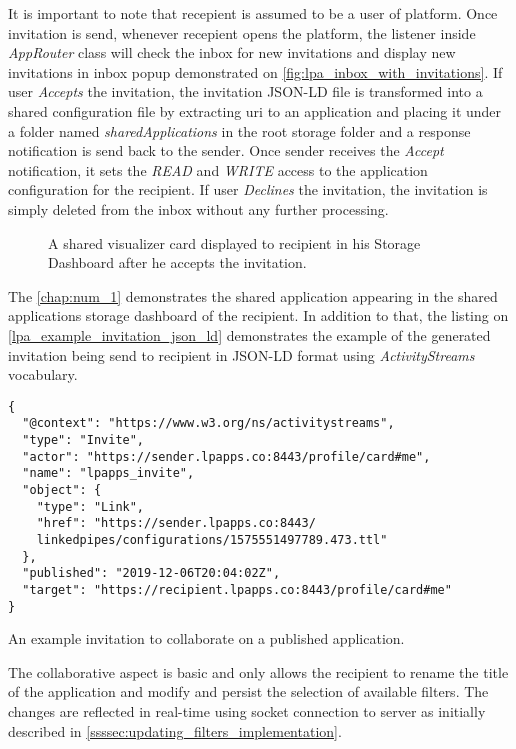  
It is important to note that recepient is assumed to be a user of \lpa{} platform. Once invitation is send, whenever recepient opens the platform, the listener inside \textit{AppRouter} class will check the inbox for new invitations and display new invitations in inbox popup demonstrated on \autoref{fig:lpa_inbox_with_invitations}. If user \textit{Accepts} the invitation, the invitation JSON-LD file is transformed into a shared configuration file by extracting uri to an application and placing it under a folder named \textit{sharedApplications} in the root storage folder and a response notification is send back to the sender. Once sender receives the \textit{Accept} notification, it sets the \textit{READ} and \textit{WRITE} access to the application configuration for the recipient. If user \textit{Declines} the invitation, the invitation is simply deleted from the inbox without any further processing.

\begin{figure}[h]
\centering
{}
\caption{A shared visualizer card displayed to recipient in his Storage Dashboard after he accepts the invitation.}
\label{fig:lpa_shared_visualizer_card}
\end{figure}

The \autoref{chap:num_1} demonstrates the shared application appearing in the shared applications storage dashboard of the recipient. In addition to that, the listing on \autoref{lpa_example_invitation_json_ld} demonstrates the example of the generated invitation being send to recipient in JSON-LD format using \textit{ActivityStreams} vocabulary. 

\begin{listing}[H]    
\begin{verbatim}
{
  "@context": "https://www.w3.org/ns/activitystreams",
  "type": "Invite",
  "actor": "https://sender.lpapps.co:8443/profile/card#me",
  "name": "lpapps_invite",
  "object": {
    "type": "Link",
    "href": "https://sender.lpapps.co:8443/
    linkedpipes/configurations/1575551497789.473.ttl"
  },
  "published": "2019-12-06T20:04:02Z",
  "target": "https://recipient.lpapps.co:8443/profile/card#me"
}
\end{verbatim}
\caption{An example invitation to collaborate on a published application.} 
\label{lst:lpa_example_invitation_json_ld}
\end{listing}

The collaborative aspect is basic and only allows the recipient to rename the title of the application and modify and persist the selection of available filters. The changes are reflected in real-time using socket connection to \solid{} server as initially described in \autoref{ssssec:updating_filters_implementation}.


